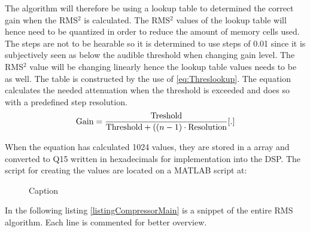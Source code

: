 The algorithm will therefore be using a lookup table to determined the correct gain when the RMS$^2$ is calculated. The RMS$^2$ values of the lookup table will hence need to be quantized in order to reduce the amount of memory cells used. The steps are not to be hearable so it is determined to use steps of 0.01 since it is subjectively seen as below the audible threshold when changing gain level. The RMS$^2$ value will be changing linearly hence the lookup table values needs to be as well. The table is constructed by the use of \autoref{eq:Threslookup}. The equation calculates the needed attenuation when the threshold is exceeded and does so with a predefined step resolution. 
\vspace{-2mm}
\begin{equation}\label{eq:Threslookup}
\text{Gain}=\frac{\text{Treshold}}{\text{Threshold}+((n-1) \cdot \text{Resolution}}\enhed{.}
\end{equation}
\begin{where}
\end{where}

\vspace{2mm}
When the equation has calculated 1024 values, they are stored in a array and converted to Q15 written in hexadecimals for implementation into the DSP.
The script for creating the values are located on a MATLAB script at: \\
 

\begin{figure}[H]
	\centering
	
	\caption{Caption }
	\label{fig:Driver10Test}
\end{figure}


In the following listing \ref{listingCompressorMain} is a snippet of the entire RMS algorithm. Each line is commented for better overview.

